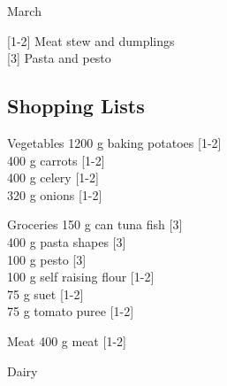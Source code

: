 		\begin{menu}{March}
    
    \begin{recipelist}
    
        {\scriptsize[1-2]} Meat stew and dumplings\\
        {\scriptsize[3]} Pasta and pesto\\
    \end{recipelist}%
    \begin{recipelist}
    
    \end{recipelist}\par%
  
    \subsection*{Shopping Lists}
      \begin{shoppinglist}{Vegetables}
      1200 g baking potatoes 
        {\scriptsize[1-2]}\\
      400 g carrots 
        {\scriptsize[1-2]}\\
      400 g celery 
        {\scriptsize[1-2]}\\
      320 g onions 
        {\scriptsize[1-2]}\\
      \end{shoppinglist}%
      \begin{shoppinglist}{Groceries}
      150 g can tuna fish 
        {\scriptsize[3]}\\
      400 g pasta shapes 
        {\scriptsize[3]}\\
      100 g pesto 
        {\scriptsize[3]}\\
      100 g self raising flour 
        {\scriptsize[1-2]}\\
      75 g suet 
        {\scriptsize[1-2]}\\
      75 g tomato puree 
        {\scriptsize[1-2]}\\
      \end{shoppinglist}%
      \par\vfil %
      \begin{shoppinglist}{Meat}
      400 g meat 
        {\scriptsize[1-2]}\\
      \end{shoppinglist}%
      \begin{shoppinglist}{Dairy}
      \end{shoppinglist}%

\end{menu}
